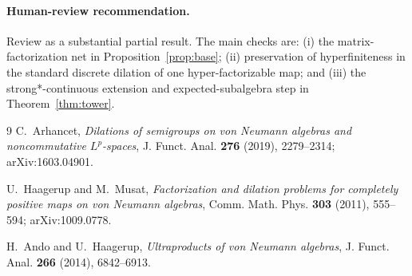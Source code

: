 \documentclass[11pt]{article}
\begin{document}
\paragraph{Human-review recommendation.}
Review as a substantial partial result.  The main checks are: (i) the
matrix-factorization net in Proposition~\ref{prop:base}; (ii) preservation of
hyperfiniteness in the standard discrete dilation of one hyper-factorizable
map; and (iii) the strong*-continuous extension and expected-subalgebra step
in Theorem~\ref{thm:tower}.

\begin{thebibliography}{9}
C.~Arhancet,
\emph{Dilations of semigroups on von Neumann algebras and noncommutative
$L^p$-spaces},
J. Funct. Anal. \textbf{276} (2019), 2279--2314;
arXiv:1603.04901.

U.~Haagerup and M.~Musat,
\emph{Factorization and dilation problems for completely positive maps on
von Neumann algebras},
Comm. Math. Phys. \textbf{303} (2011), 555--594;
arXiv:1009.0778.

H.~Ando and U.~Haagerup,
\emph{Ultraproducts of von Neumann algebras},
J. Funct. Anal. \textbf{266} (2014), 6842--6913.
\end{thebibliography}
\end{document}
